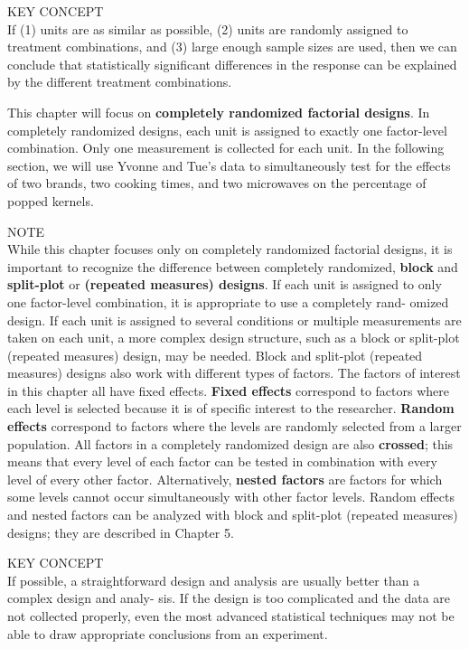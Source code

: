 \documentclass[
]{report}
\theoremstyle{definition}
\theoremstyle{definition}
\theoremstyle{definition}
\theoremstyle{definition}
\theoremstyle{remark}
\begin{document}
KEY CONCEPT\\
If (1) units are as similar as possible, (2) units are randomly assigned to treatment combinations, and
(3) large enough sample sizes are used, then we can conclude that statistically significant differences
in the response can be explained by the different treatment combinations.

This chapter will focus on \textbf{completely randomized factorial designs}. In completely randomized designs,
each unit is assigned to exactly one factor-level combination. Only one measurement is collected for each
unit. In the following section, we will use Yvonne and Tue's data to simultaneously test for the effects of two
brands, two cooking times, and two microwaves on the percentage of popped kernels.

NOTE\\
While this chapter focuses only on completely randomized factorial designs, it is important to recognize
the difference between completely randomized, \textbf{block} and \textbf{split-plot} or \textbf{(repeated measures) designs}.
If each unit is assigned to only one factor-level combination, it is appropriate to use a completely rand-
omized design. If each unit is assigned to several conditions or multiple measurements are taken on each
unit, a more complex design structure, such as a block or split-plot (repeated measures) design, may be
needed.
Block and split-plot (repeated measures) designs also work with different types of factors. The factors
of interest in this chapter all have fixed effects. \textbf{Fixed effects} correspond to factors where each level is
selected because it is of specific interest to the researcher. \textbf{Random effects} correspond to factors where
the levels are randomly selected from a larger population. All factors in a completely randomized design
are also \textbf{crossed}; this means that every level of each factor can be tested in combination with every
level of every other factor. Alternatively, \textbf{nested factors} are factors for which some levels cannot occur
simultaneously with other factor levels. Random effects and nested factors can be analyzed with block
and split-plot (repeated measures) designs; they are described in Chapter 5.

KEY CONCEPT\\
If possible, a straightforward design and analysis are usually better than a complex design and analy-
sis. If the design is too complicated and the data are not collected properly, even the most advanced
statistical techniques may not be able to draw appropriate conclusions from an experiment.
\end{document}
